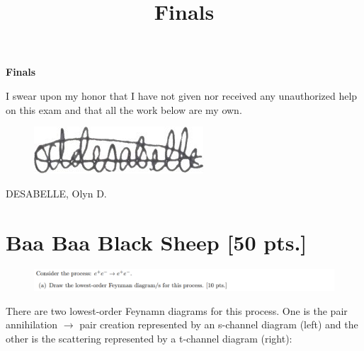 \documentclass[11pt]{article}
\theoremstyle{definition}
\numberwithin{equation}{section}
\begin{document}
\title{Finals}

\pagestyle{fancy}
\fancyhf{}

\begin{center}
{\LARGE \bf Finals}\\
\end{center}

\begin{mdframed}
    I swear upon my honor that I have not given nor received any unauthorized help on this exam and that all the work below are my own.
\end{mdframed}
\begin{figure}[H]
    \includegraphics[scale = 15]{my e-sig.jpg}
\end{figure}

DESABELLE, Olyn D.

\noindent\makebox[\linewidth]{\rule{\paperwidth}{0.4pt}}

\section{\textbf{Baa Baa Black Sheep} [50 pts.]}


\begin{figure}[H]
    \centering
    \includegraphics[scale = 0.4]{1a.png}
\end{figure}

There are two lowest-order Feynamn diagrams for this process. One is the pair annihilation $\to$ pair creation represented by an s-channel diagram (left) and the other is the scattering represented by a t-channel diagram (right):
\end{document}

